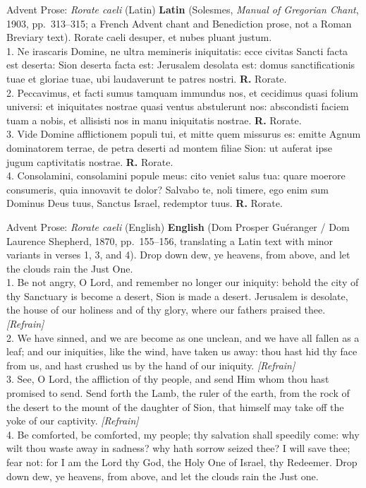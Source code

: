 \begin{massbox}{Advent Prose: \textit{Rorate caeli} (Latin)}
\textbf{Latin} (Solesmes, \textit{Manual of Gregorian Chant}, 1903, pp.~313--315;
a French Advent chant and Benediction prose, not a Roman Breviary text).
Rorate caeli desuper, et nubes pluant justum.\\[0.3em]
1. Ne irascaris Domine, ne ultra memineris iniquitatis: ecce civitas Sancti
facta est deserta: Sion deserta facta est: Jerusalem desolata est: domus
sanctificationis tuae et gloriae tuae, ubi laudaverunt te patres nostri.
\textbf{R.} Rorate.\\[0.3em]
2. Peccavimus, et facti sumus tamquam immundus nos, et cecidimus quasi folium
universi: et iniquitates nostrae quasi ventus abstulerunt nos: abscondisti
faciem tuam a nobis, et allisisti nos in manu iniquitatis nostrae. \textbf{R.}
Rorate.\\[0.3em]
3. Vide Domine afflictionem populi tui, et mitte quem missurus es: emitte Agnum
dominatorem terrae, de petra deserti ad montem filiae Sion: ut auferat ipse
jugum captivitatis nostrae. \textbf{R.} Rorate.\\[0.3em]
4. Consolamini, consolamini popule meus: cito veniet salus tua: quare moerore
consumeris, quia innovavit te dolor? Salvabo te, noli timere, ego enim sum
Dominus Deus tuus, Sanctus Israel, redemptor tuus. \textbf{R.} Rorate.
\end{massbox}

\begin{massbox}{Advent Prose: \textit{Rorate caeli} (English)}
\textbf{English} (Dom Prosper Gu\'eranger / Dom Laurence Shepherd, 1870,
pp.~155--156, translating a Latin text with minor variants in verses 1, 3, and
4). Drop down dew, ye heavens, from above, and let the clouds rain the Just
One.\\[0.3em]
1. Be not angry, O Lord, and remember no longer our iniquity: behold the city of
thy Sanctuary is become a desert, Sion is made a desert. Jerusalem is desolate,
the house of our holiness and of thy glory, where our fathers praised thee.
\textit{[Refrain]}\\[0.3em]
2. We have sinned, and we are become as one unclean, and we have all fallen as a
leaf; and our iniquities, like the wind, have taken us away: thou hast hid thy
face from us, and hast crushed us by the hand of our iniquity.
\textit{[Refrain]}\\[0.3em]
3. See, O Lord, the affliction of thy people, and send Him whom thou hast
promised to send. Send forth the Lamb, the ruler of the earth, from the rock of
the desert to the mount of the daughter of Sion, that himself may take off the
yoke of our captivity. \textit{[Refrain]}\\[0.3em]
4. Be comforted, be comforted, my people; thy salvation shall speedily come: why
wilt thou waste away in sadness? why hath sorrow seized thee? I will save thee;
fear not: for I am the Lord thy God, the Holy One of Israel, thy Redeemer. Drop
down dew, ye heavens, from above, and let the clouds rain the Just one.
\end{massbox}

